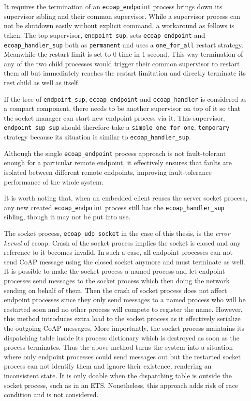 It requires the termination of an \verb|ecoap_endpoint| process brings down its supervisor sibling and their common supervisor. While a supervisor process can not be shutdown easily without explicit command, a workaround as follows is taken. The top supervisor, \verb|endpoint_sup|, sets \verb|ecoap_endpoint| and \verb|ecoap_handler_sup| both as \verb|permanent| and uses a \verb|one_for_all| restart strategy. Meanwhile the restart limit is set to 0 time in 1 second. This way termination of any of the two child processes would trigger their common supervisor to restart them all but immediately reaches the restart limitation and directly terminate its rest child as well as itself. 

If the tree of \verb|endpoint_sup|, \verb|ecoap_endpoint| and \verb|ecoap_handler| is considered as a compact component, there needs to be another supervisor on top of it so that the socket manager can start new endpoint process via it. This supervisor, \verb|endpoint_sup_sup| should therefore take a \verb|simple_one_for_one|, \verb|temporary| strategy because its situation is similar to \verb|ecoap_handler_sup|. 

Although the single \verb|ecoap_endpoint| process approach is not fault-tolerant enough for a particular remote endpoint, it effectively ensures that faults are isolated between different remote endpoints, improving fault-tolerance performance of the whole system. 

It is worth noting that, when an embedded client reuses the server socket process, any new created \verb|ecoap_endpoint| process still has the \verb|ecoap_handler_sup| sibling, though it may not be put into use. 

The socket process, \verb|ecoap_udp_socket| in the case of this thesis, is the \textit{error kernel} of ecoap. Crash of the socket process implies the socket is closed and any reference to it becomes invalid. In such a case, all endpoint processes can not send CoAP message using the closed socket anymore and must terminate as well. It is possible to make the socket process a named process and let endpoint processes send messages to the socket process which then doing the network sending on behalf of them. Then the crash of socket process does not affect endpoint processes since they only send messages to a named process who will be restarted soon and no other process will compete to register the name. However, this method introduces extra load to the socket process as it effectively serialize the outgoing CoAP messages. More importantly, the socket process maintains its dispatching table inside its process dictionary which is destroyed as soon as the process terminates. Thus the above method turns the system into a situation where only endpoint processes could send messages out but the restarted socket process can not identify them and ignore their existence, rendering an inconsistent state. It is only doable when the dispatching table is outside the socket process, such as in an ETS. Nonetheless, this approach adds risk of race condition and is not considered. 

